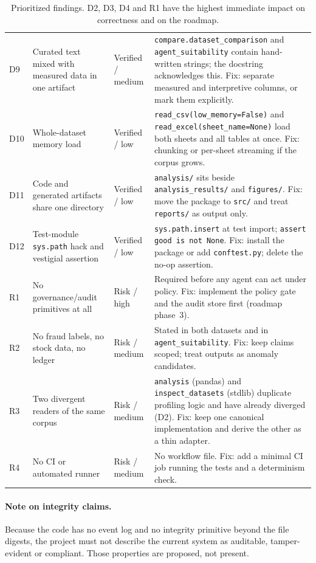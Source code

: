 \documentclass[11pt,a4paper]{article}
\newcommand{\code}[1]{\texttt{#1}}
\begin{document}
\begin{table}[H]
\begin{tabularx}{\textwidth}{L{0.7cm}L{4.1cm}L{1.6cm}X}
D9 & Curated text mixed with measured data in one artifact & Verified / medium & \code{compare.dataset\_comparison} and \code{agent\_suitability} contain hand-written strings; the docstring acknowledges this. Fix: separate measured and interpretive columns, or mark them explicitly. \\
D10 & Whole-dataset memory load & Verified / low & \code{read\_csv(low\_memory=False)} and \code{read\_excel(sheet\_name=None)} load both sheets and all tables at once. Fix: chunking or per-sheet streaming if the corpus grows. \\
D11 & Code and generated artifacts share one directory & Verified / low & \code{analysis/} sits beside \code{analysis\_results/} and \code{figures/}. Fix: move the package to \code{src/} and treat \code{reports/} as output only. \\
D12 & Test-module \code{sys.path} hack and vestigial assertion & Verified / low & \code{sys.path.insert} at test import; \code{assert good is not None}. Fix: install the package or add \code{conftest.py}; delete the no-op assertion. \\
R1 & No governance/audit primitives at all & Risk / high & Required before any agent can act under policy. Fix: implement the policy gate and the audit store first (roadmap phase~3). \\
R2 & No fraud labels, no stock data, no ledger & Risk / medium & Stated in both datasets and in \code{agent\_suitability}. Fix: keep claims scoped; treat outputs as anomaly candidates. \\
R3 & Two divergent readers of the same corpus & Risk / medium & \code{analysis} (pandas) and \code{inspect\_datasets} (stdlib) duplicate profiling logic and have already diverged (D2). Fix: keep one canonical implementation and derive the other as a thin adapter. \\
R4 & No CI or automated runner & Risk / medium & No workflow file. Fix: add a minimal CI job running the tests and a determinism check. \\
\bottomrule
\end{tabularx}
\caption{Prioritized findings. D2, D3, D4 and R1 have the highest immediate impact on correctness and on the roadmap.}
\label{tab:limits}
\end{table}

\paragraph{Note on integrity claims.} Because the code has no event log and no integrity primitive beyond the file digests, the project must not describe the current system as auditable, tamper-evident or compliant. Those properties are proposed, not present.
\end{document}
